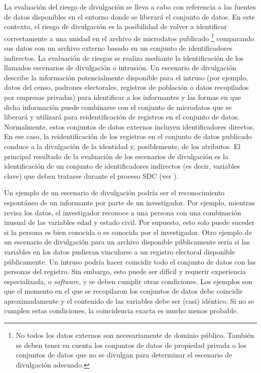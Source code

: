\documentclass[
]{book}
\theoremstyle{definition}
\theoremstyle{definition}
\theoremstyle{definition}
\theoremstyle{definition}
\theoremstyle{remark}
\begin{document}
La evaluación del riesgo de divulgación se lleva a cabo con referencia a las fuentes de datos disponibles en el entorno donde se liberará el conjunto de datos. En este contexto, el riesgo de divulgación es la posibilidad de volver a identificar correctamente a una unidad en el archivo de microdatos publicado \footnote{No todos los datos externos son necesariamente de dominio público. También se deben tener en cuenta los conjuntos de datos de propiedad privada o los conjuntos de datos que no se divulgan para determinar el escenario de divulgación adecuado.} comparando sus datos con un archivo externo basado en un conjunto de identificadores indirectos. La evaluación de riesgos se realiza mediante la identificación de los llamados escenarios de divulgación o intrusión. Un escenario de divulgación describe la información potencialmente disponible para el intruso (por ejemplo, datos del censo, padrones electorales, registros de población o datos recopilados por empresas privadas) para identificar a los informantes y las formas en que dicha información puede combinarse con el conjunto de microdatos que se liberará y utilizará para reidentificación de registros en el conjunto de datos. Normalmente, estos conjuntos de datos externos incluyen identificadores directos. En ese caso, la reidentificación de los registros en el conjunto de datos publicado conduce a la divulgación de la identidad y, posiblemente, de los atributos. El principal resultado de la evaluación de los escenarios de divulgación es la identificación de un conjunto de identificadores indirectos (es decir, variables clave) que deben tratarse durante el proceso SDC (ver \citet{elliot2010}).

Un ejemplo de un escenario de divulgación podría ser el reconocimiento espontáneo de un informante por parte de un investigador. Por ejemplo, mientras revisa los datos, el investigador reconoce a una persona con una combinación inusual de las variables edad y estado civil. Por supuesto, esto solo puede suceder si la persona es bien conocida o es conocida por el investigador. Otro ejemplo de un escenario de divulgación para un archivo disponible públicamente sería si las variables en los datos pudieran vincularse a un registro electoral disponible públicamente. Un intruso podría hacer coincidir todo el conjunto de datos con las personas del registro. Sin embargo, esto puede ser difícil y requerir experiencia especializada, o \emph{software}, y se deben cumplir otras condiciones. Los ejemplos son que el momento en el que se recopilaron los conjuntos de datos debe coincidir aproximadamente y el contenido de las variables debe ser (casi) idéntico. Si no se cumplen estas condiciones, la coincidencia exacta es mucho menos probable.
\end{document}
